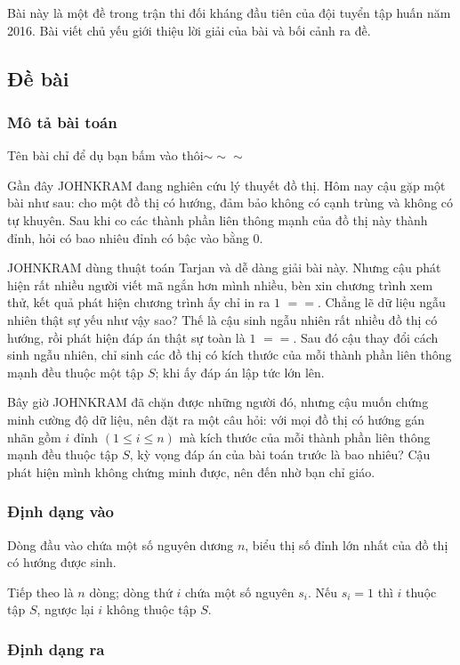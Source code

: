 \documentclass[11pt]{article}
\begin{document}
Bài này là một đề trong trận thi đối kháng đầu tiên của đội tuyển tập huấn năm
2016. Bài viết chủ yếu giới thiệu lời giải của bài và bối cảnh ra đề.

\subsection{Đề bài}

\subsubsection{Mô tả bài toán}

Tên bài chỉ để dụ bạn bấm vào thôi\(\sim\sim\sim\)

Gần đây JOHNKRAM đang nghiên cứu lý thuyết đồ thị. Hôm nay cậu gặp một bài
như sau: cho một đồ thị có hướng, đảm bảo không có cạnh trùng và không có tự
khuyên. Sau khi co các thành phần liên thông mạnh của đồ thị này thành đỉnh,
hỏi có bao nhiêu đỉnh có bậc vào bằng \(0\).

JOHNKRAM dùng thuật toán Tarjan và dễ dàng giải bài này. Nhưng cậu phát hiện
rất nhiều người viết mã ngắn hơn mình nhiều, bèn xin chương trình xem thử, kết
quả phát hiện chương trình ấy chỉ in ra \(1\) \(= =\). Chẳng lẽ dữ liệu ngẫu
nhiên thật sự yếu như vậy sao? Thế là cậu sinh ngẫu nhiên rất nhiều đồ thị có
hướng, rồi phát hiện đáp án thật sự toàn là \(1\) \(= =\). Sau đó cậu thay đổi
cách sinh ngẫu nhiên, chỉ sinh các đồ thị có kích thước của mỗi thành phần
liên thông mạnh đều thuộc một tập \(S\); khi ấy đáp án lập tức lớn lên.

Bây giờ JOHNKRAM đã chặn được những người đó, nhưng cậu muốn chứng minh cường
độ dữ liệu, nên đặt ra một câu hỏi: với mọi đồ thị có hướng gán nhãn gồm
\(i\) đỉnh \((1\le i\le n)\) mà kích thước của mỗi thành phần liên thông mạnh
đều thuộc tập \(S\), kỳ vọng đáp án của bài toán trước là bao nhiêu? Cậu phát
hiện mình không chứng minh được, nên đến nhờ bạn chỉ giáo.

\subsubsection{Định dạng vào}

Dòng đầu vào chứa một số nguyên dương \(n\), biểu thị số đỉnh lớn nhất của đồ
thị có hướng được sinh.

Tiếp theo là \(n\) dòng; dòng thứ \(i\) chứa một số nguyên \(s_i\). Nếu
\(s_i=1\) thì \(i\) thuộc tập \(S\), ngược lại \(i\) không thuộc tập \(S\).

\subsubsection{Định dạng ra}
\end{document}
